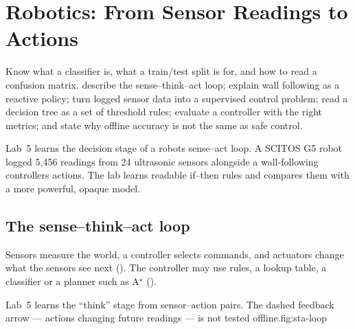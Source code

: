 \chapter{Robotics: From Sensor Readings to Actions}
\label{ch:robotics}

\chapterguide%
  {Know what a classifier is, what a train/test split is for, and how to read a confusion matrix.}
  {describe the sense--think--act loop; explain wall following as a reactive policy; turn logged sensor data into a supervised control problem; read a decision tree as a set of threshold rules; evaluate a controller with the right metrics; and state why offline accuracy is not the same as safe control.}

Lab~5 learns the decision stage of a robot\textquotesingle s sense--act loop. A SCITOS G5 robot logged 5,456 readings from 24 ultrasonic sensors alongside a wall-following controller\textquotesingle s actions. The lab learns readable if--then rules and compares them with a more powerful, opaque model.

\section{The sense--think--act loop}

Sensors measure the world, a controller selects commands, and actuators change what the sensors see next (). The controller may use rules, a lookup table, a classifier or a planner such as A$^\star$ ().

\begin{aifig}{Lab~5 learns the ``think'' stage from sensor--action pairs. The dashed feedback arrow --- actions changing future readings --- is not tested offline.}{fig:sta-loop}
\end{aifig}

